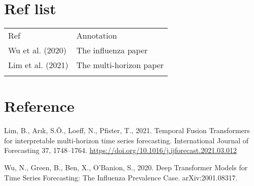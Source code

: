 \hypertarget{ref-list}{%
\section{Ref list}\label{ref-list}}

\begin{longtable}[]{@{}ll@{}}
\toprule
Ref & Annotation \\ \addlinespace
\midrule
\endhead
Wu et al. (2020) & The influenza paper \\ \addlinespace
Lim et al. (2021) & The multi-horizon paper \\ \addlinespace
\bottomrule
\end{longtable}

\hypertarget{bibliography}{%
\section*{Reference}\label{bibliography}}

\hypertarget{refs}{}
\begin{CSLReferences}{1}{0}
\leavevmode\hypertarget{ref-limTemporalFusionTransformers2021}{}%
Lim, B., Arık, S.Ö., Loeff, N., Pfister, T., 2021. Temporal {Fusion
Transformers} for interpretable multi-horizon time series forecasting.
International Journal of Forecasting 37, 1748--1764.
\url{https://doi.org/10.1016/j.ijforecast.2021.03.012}

\leavevmode\hypertarget{ref-wuDeepTransformerModels2020}{}%
Wu, N., Green, B., Ben, X., O'Banion, S., 2020. Deep {Transformer
Models} for {Time Series Forecasting}: {The Influenza Prevalence Case}.
arXiv:2001.08317.

\end{CSLReferences}
